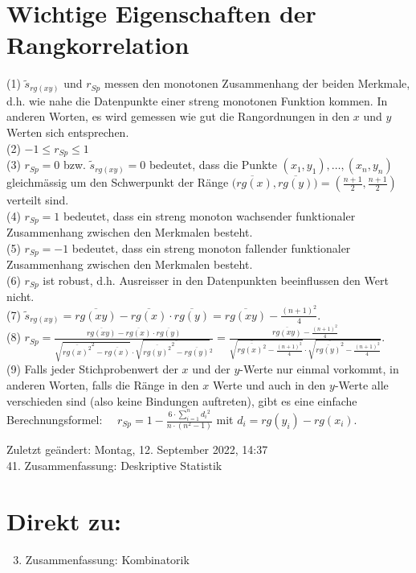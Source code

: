 \documentclass[10pt]{article}
\begin{document}
\section*{Wichtige Eigenschaften der Rangkorrelation}
(1) $\tilde{s}_{r g(x y)}$ und $r_{S p}$ messen den monotonen Zusammenhang der beiden Merkmale, d.h. wie nahe die Datenpunkte einer streng monotonen Funktion kommen. In anderen Worten, es wird gemessen wie gut die Rangordnungen in den $x$ und $y$ Werten sich entsprechen.\\
(2) $-1 \leq r_{S p} \leq 1$\\
(3) $r_{S p}=0$ bzw. $\tilde{s}_{r g(x y)}=0$ bedeutet, dass die Punkte $\left(x_{1}, y_{1}\right), \ldots,\left(x_{n}, y_{n}\right)$ gleichmässig um den Schwerpunkt der Ränge $\overline{(r g(x)}, \overline{r g(y)})=\left(\frac{n+1}{2}, \frac{n+1}{2}\right)$ verteilt sind.\\
(4) $r_{S p}=1$ bedeutet, dass ein streng monoton wachsender funktionaler Zusammenhang zwischen den Merkmalen besteht.\\
(5) $r_{S p}=-1$ bedeutet, dass ein streng monoton fallender funktionaler Zusammenhang zwischen den Merkmalen besteht.\\
(6) $r_{S p}$ ist robust, d.h. Ausreisser in den Datenpunkten beeinflussen den Wert nicht.\\
(7) $\tilde{s}_{r g(x y)}=\overline{r g(x y)}-\overline{r g(x)} \cdot \overline{r g(y)}=\overline{r g(x y)}-\frac{(n+1)^{2}}{4}$.\\
(8) $r_{S p}=\frac{\overline{r g(x y)}-\overline{r g(x)} \cdot \overline{r g(y)}}{\sqrt{{\overline{r g(x)^{2}}}^{2}-\overline{r g(x)}} \cdot \sqrt{\overline{{\overline{r g(y)^{2}}}^{2}-\overline{r g(y)}}}{ }^{2}}=\frac{\overline{r g(x y)}-\frac{(n+1)^{2}}{4}}{\sqrt{\overline{\overline{r g(x)^{2}}}-\frac{(n+1)^{2}}{4}} \cdot \sqrt{\overline{\overline{r g(y)}^{2}}-\frac{(n+1)^{2}}{4}}}$.\\
(9) Falls jeder Stichprobenwert der $x$ und der $y$-Werte nur einmal vorkommt, in anderen Worten, falls die Ränge in den $x$ Werte und auch in den $y$-Werte alle verschieden sind (also keine Bindungen auftreten), gibt es eine einfache Berechnungsformel: $\quad r_{S p}=1-\frac{6 \cdot \sum_{i=1}^{n} d_{i}{ }^{2}}{n \cdot\left(n^{2}-1\right)}$ mit $d_{i}=r g\left(y_{i}\right)-r g\left(x_{i}\right)$.

Zuletzt geändert: Montag, 12. September 2022, 14:37\\
41. Zusammenfassung: Deskriptive Statistik

\section*{Direkt zu:}
\begin{enumerate}
  \setcounter{enumi}{2}
  \item Zusammenfassung: Kombinatorik
\end{enumerate}
\end{document}
